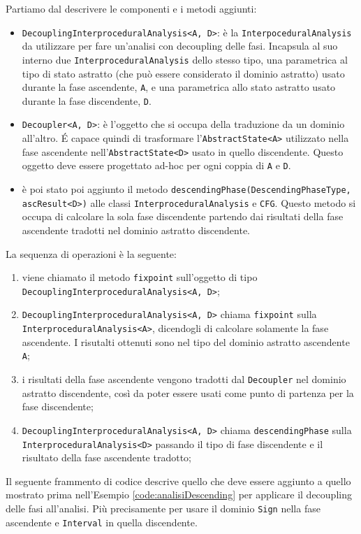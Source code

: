 Partiamo dal descrivere le componenti e i metodi aggiunti:
\begin{itemize}
\itemsep0pt
    \item \texttt{DecouplingInterproceduralAnalysis<A, D>}: è la \texttt{InterpoceduralAnalysis} da utilizzare per fare un'analisi con decoupling delle fasi. Incapsula al suo interno due \texttt{InterproceduralAnalysis} dello stesso tipo, una parametrica al tipo di stato astratto (che può essere considerato il dominio astratto) usato durante la fase ascendente, \texttt{A}, e una parametrica allo stato astratto usato durante la fase discendente, \texttt{D}. 
    \item \texttt{Decoupler<A, D>}: è l'oggetto che si occupa della traduzione da un dominio all'altro. \'E capace quindi di trasformare l'\texttt{AbstractState<A>} utilizzato nella fase ascendente nell'\texttt{AbstractState<D>} usato in quello discendente. Questo oggetto deve essere progettato ad-hoc per ogni coppia di \texttt{A} e \texttt{D}. 
    \item è poi stato poi aggiunto il metodo \texttt{descendingPhase(DescendingPhaseType, ascResult<D>)} alle classi \texttt{InterproceduralAnalysis} e \texttt{CFG}. Questo metodo si occupa di calcolare la sola fase discendente partendo dai risultati della fase ascendente tradotti nel dominio astratto discendente.
\end{itemize}
La sequenza di operazioni è la seguente:
\begin{enumerate}
\itemsep0pt
    \item viene chiamato il metodo \texttt{fixpoint} sull'oggetto di tipo \texttt{DecouplingInterproceduralAnalysis<A, D>};
    \item \texttt{DecouplingInterproceduralAnalysis<A, D>} chiama \texttt{fixpoint} sulla \texttt{InterproceduralAnalysis<A>}, dicendogli di calcolare solamente la fase ascendente. I risutalti ottenuti sono nel tipo del dominio astratto ascendente \texttt{A};
    \item i risultati della fase ascendente vengono tradotti dal \texttt{Decoupler} nel dominio astratto discendente, così da poter essere usati come punto di partenza per la fase discendente;
    \item \texttt{DecouplingInterproceduralAnalysis<A, D>} chiama \texttt{descendingPhase} sulla \texttt{InterproceduralAnalysis<D>} passando il tipo di fase discendente e il risultato della fase ascendente tradotto;
\end{enumerate}
Il seguente frammento di codice descrive quello che deve essere aggiunto a quello mostrato prima nell'Esempio \ref{code:analisiDescending} per applicare il decoupling delle fasi all'analisi. Più precisamente per usare il dominio \texttt{Sign} nella fase ascendente e \texttt{Interval} in quella discendente. 
